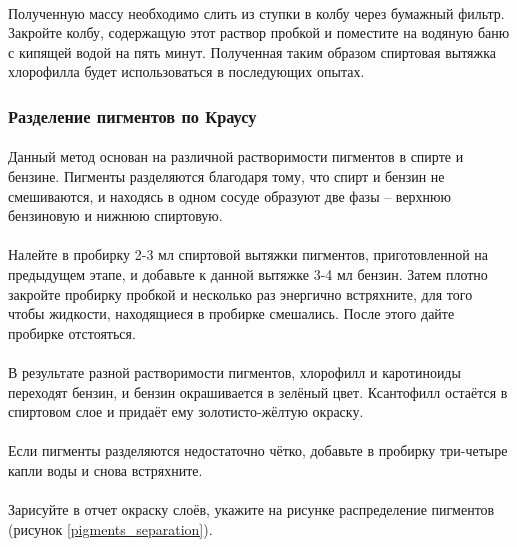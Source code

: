 \paragraph*{}Полученную массу необходимо слить из ступки в колбу через бумажный фильтр. Закройте колбу, содержащую этот раствор пробкой и поместите на водяную баню с кипящей водой на пять минут. Полученная таким образом спиртовая вытяжка хлорофилла будет использоваться в последующих опытах.

\subsubsection*{Разделение пигментов по Краусу}

\paragraph*{}Данный метод основан на различной растворимости пигментов в спирте и бензине. Пигменты разделяются благодаря тому, что спирт и бензин не смешиваются, и находясь в одном сосуде образуют две фазы – верхнюю бензиновую и нижнюю спиртовую.

\paragraph*{}Налейте в пробирку 2-3 мл спиртовой вытяжки пигментов, приготовленной на предыдущем этапе, и добавьте к данной вытяжке 3-4 мл бензин. Затем плотно закройте пробирку пробкой и несколько раз энергично встряхните, для того чтобы жидкости, находящиеся в пробирке смешались. После этого дайте пробирке отстояться.

\paragraph*{}В результате разной растворимости пигментов, хлорофилл и каротиноиды переходят бензин, и бензин окрашивается в зелёный цвет. Ксантофилл остаётся в спиртовом слое и придаёт ему золотисто-жёлтую окраску. 

\paragraph*{}Если пигменты разделяются недостаточно чётко, добавьте в пробирку три-четыре капли воды и снова встряхните. 

\paragraph*{}Зарисуйте в отчет окраску слоёв, укажите на рисунке распределение пигментов (рисунок \ref{pigments_separation}).

